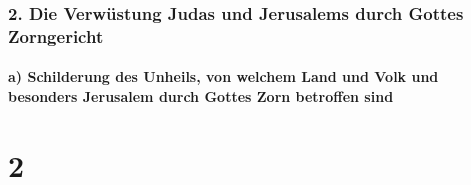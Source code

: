 \hypertarget{die-verwuxfcstung-judas-und-jerusalems-durch-gottes-zorngericht}{%
\subsubsection{2. Die Verwüstung Judas und Jerusalems durch Gottes
Zorngericht}\label{die-verwuxfcstung-judas-und-jerusalems-durch-gottes-zorngericht}}

\hypertarget{a-schilderung-des-unheils-von-welchem-land-und-volk-und-besonders-jerusalem-durch-gottes-zorn-betroffen-sind}{%
\paragraph{a) Schilderung des Unheils, von welchem Land und Volk und
besonders Jerusalem durch Gottes Zorn betroffen
sind}\label{a-schilderung-des-unheils-von-welchem-land-und-volk-und-besonders-jerusalem-durch-gottes-zorn-betroffen-sind}}

\hypertarget{section-1}{%
\section{2}\label{section-1}}

